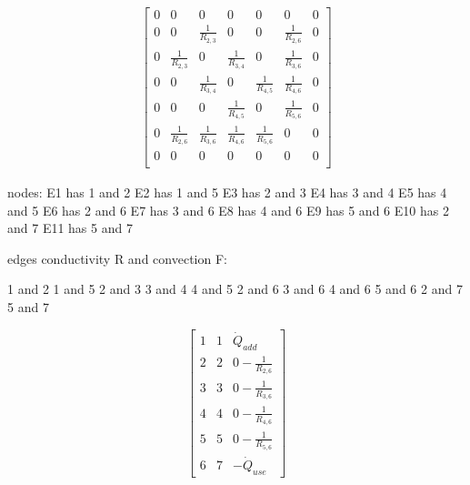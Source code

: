 \begin{equation}
	\begin{aligned}
		\begin{bmatrix}
			0 & 0 & 0 & 0 & 0 & 0 & 0\\
			0 & 0 & \frac{1}{R_{2,3}} & 0 & 0 & \frac{1}{R_{2,6}} & 0 \\
			0 & \frac{1}{R_{2,3}} & 0 & \frac{1}{R_{3,4}} & 0 & \frac{1}{R_{3,6}} & 0\\
			0 & 0 & \frac{1}{R_{3,4}} & 0 & \frac{1}{R_{4,5}} & \frac{1}{R_{4,6}} & 0\\
			0 & 0 & 0 & \frac{1}{R_{4,5}} & 0 & \frac{1}{R_{5,6}} & 0 \\
			0 & \frac{1}{R_{2,6}} & \frac{1}{R_{3,6}} & \frac{1}{R_{4,6}} & \frac{1}{R_{5,6}} & 0 & 0\\
			0 & 0 & 0 & 0 & 0 & 0 & 0\\
		\end{bmatrix}
	\end{aligned}
\end{equation}

nodes:
E1 has 1 and 2
E2 has 1 and 5
E3 has 2 and 3
E4 has 3 and 4
E5 has 4 and 5
E6 has 2 and 6
E7 has 3 and 6
E8 has 4 and 6
E9 has 5 and 6
E10 has 2 and 7
E11 has 5 and 7

edges conductivity R and convection F:

1 and 2
1 and 5
2 and 3
3 and 4
4 and 5
2 and 6
3 and 6
4 and 6
5 and 6
2 and 7
5 and 7

\[
\begin{bmatrix}
	1 & 1 & \dot{Q}_{add}\\
	2 & 2 & 0 - \frac{1}{R_{2,6}}\\
	3 & 3 & 0 - \frac{1}{R_{3,6}}\\
	4 & 4 & 0 - \frac{1}{R_{4,6}}\\
	5 & 5 & 0 - \frac{1}{R_{5,6}}\\
	6 & 7 & -\dot{Q}_{use}
\end{bmatrix}
\]

\newpage